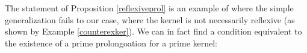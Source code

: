 The statement of Proposition \ref{reflexiveprol} is an example of where the simple generalization fails to our case, where the kernel is not necessarily reflexive (as shown by Example \ref{counterexker}). We can in fact find a condition equivalent to the existence of a prime prolongoation for a prime kernel:



